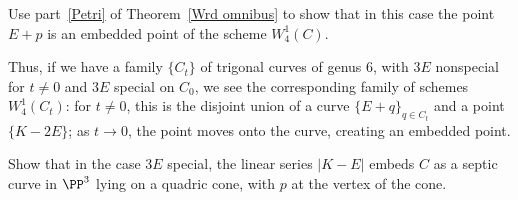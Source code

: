 \begin{exercise}
Use part~\ref{Petri} of Theorem~\ref{Wrd omnibus} to show that in this case the point $E+p$ is an embedded point of the scheme $W^1_4(C)$.
\end{exercise} 

Thus, if we have a family $\{C_t\}$ of trigonal curves of genus 6, with $3E$ nonspecial for $t \neq 0$ and $3E$ special on $C_0$, we see the corresponding family of schemes $W^1_4(C_t)$: for $t \neq 0$, this is the disjoint union of a curve $\{E+q\}_{q \in C_t}$ and a point $\{K-2E\}$; as $t \to 0$, the point moves onto the curve, creating an embedded point.

\begin{exercise}
Show that in the case $3E$ special, the linear series $|K-E|$ embeds $C$ as a septic curve in $\PP^3$ lying on a quadric cone, with $p$ at the vertex of the cone.
\end{exercise}



%
%



